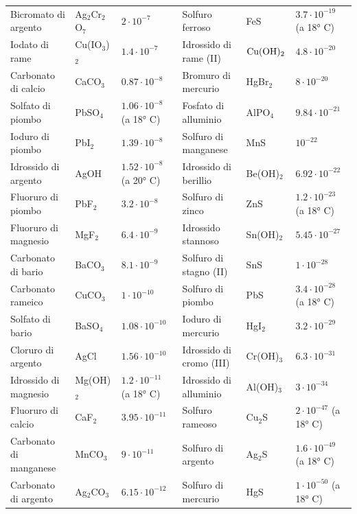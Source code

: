 \begin{tabular}{p{3.4cm}p{1.6cm}p{2.5cm}p{3.4cm}p{1.6cm}p{2.5cm}}
    Bicromato di argento & Ag$_2$Cr$_2$O$_7$ & $2 \cdot 10^{-7}$ & Solfuro ferroso & FeS & $3.7 \cdot 10^{-19}$ (a 18° C)\\[0.7ex]
    Iodato di rame & Cu(IO$_3$)$_2$ & $1.4 \cdot 10^{-7}$ & Idrossido di rame (II) & $\rm Cu(OH)_2$ & $4.8 \cdot 10^{-20}$\\[0.7ex]
    Carbonato di calcio & CaCO$_3$ & $0.87 \cdot 10^{-8}$ & Bromuro di mercurio & HgBr$_2$ & $8 \cdot 10^{-20}$\\[0.7ex]
    Solfato di piombo & PbSO$_4$ & $1.06 \cdot 10^{-8}$ (a 18° C) & Fosfato di alluminio & AlPO$_4$ & $9.84 \cdot 10^{-21}$\\[0.7ex]
    Ioduro di piombo & PbI$_2$ & $1.39 \cdot 10^{-8}$ & Solfuro di manganese & MnS & $10^{-22}$\\[0.7ex]
    Idrossido di argento & AgOH & $1.52 \cdot 10^{-8}$ (a 20° C)& Idrossido di berillio & Be(OH)$_2$ & $6.92 \cdot 10^{-22}$\\[0.7ex]
    Fluoruro di piombo & PbF$_2$ & $3.2 \cdot 10^{-8}$ & Solfuro di zinco & ZnS & $1.2 \cdot 10^{-23}$ (a 18° C)\\[0.7ex]
    Fluoruro di magnesio & MgF$_2$ & $6.4 \cdot 10^{-9}$ & Idrossido stannoso & Sn(OH)$_2$ & $5.45 \cdot 10^{-27}$\\[0.7ex]
    Carbonato di bario & BaCO$_3$ & $8.1 \cdot 10^{-9}$ &Solfuro di stagno (II)  & SnS & $1 \cdot 10^{-28}$\\[0.7ex]
    Carbonato rameico & CuCO$_3$ & $1 \cdot 10^{-10}$ & Solfuro di piombo & PbS & $3.4 \cdot 10^{-28}$ (a 18° C)\\[0.7ex]
    Solfato di bario & BaSO$_4$ & $1.08 \cdot 10^{-10}$ & Ioduro di mercurio & HgI$_2$ & $3.2 \cdot 10^{-29}$ \\[0.7ex]
    Cloruro di argento & AgCl & $1.56 \cdot 10^{-10}$ & Idrossido di cromo (III) & Cr(OH)$_3$ & $6.3 \cdot 10^{-31}$\\[0.7ex]
    Idrossido di magnesio & Mg(OH)$_2$ & $1.2 \cdot 10^{-11}$ (a 18° C) & Idrossido di alluminio & Al(OH)$_3$ & $3 \cdot 10^{-34}$\\[0.7ex]
    Fluoruro di calcio & CaF$_2$ & $3.95 \cdot 10^{-11}$ & Solfuro rameoso & Cu$_2$S & $2 \cdot 10^{-47}$ (a 18° C)\\[0.7ex]
    Carbonato di manganese & MnCO$_3$ & $9 \cdot 10^{-11}$ & Solfuro di argento & Ag$_2$S & $1.6 \cdot 10^{-49}$ (a 18° C)\\[0.7ex]
    Carbonato di argento & Ag$_2$CO$_3$ & $6.15 \cdot 10^{-12}$ & Solfuro di mercurio & HgS & $1 \cdot 10^{-50}$ (a 18° C)\\[0.7ex]

\end{tabular}

